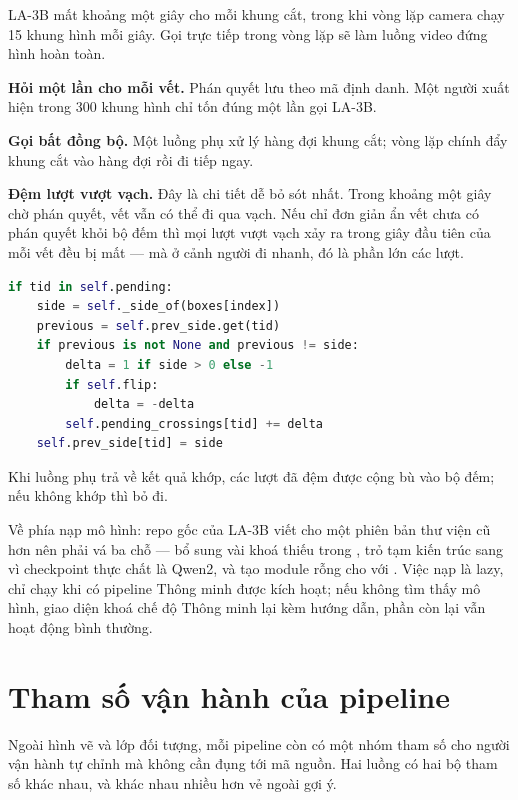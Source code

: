 LA-3B mất khoảng một giây cho mỗi khung cắt, trong khi vòng lặp camera chạy 15 khung
hình mỗi giây. Gọi trực tiếp trong vòng lặp sẽ làm luồng video đứng hình hoàn toàn.

\textbf{Hỏi một lần cho mỗi vết.} Phán quyết lưu theo mã định danh. Một người xuất hiện
trong 300 khung hình chỉ tốn đúng một lần gọi LA-3B.

\textbf{Gọi bất đồng bộ.} Một luồng phụ xử lý hàng đợi khung cắt; vòng lặp chính đẩy
khung cắt vào hàng đợi rồi đi tiếp ngay.

\textbf{Đệm lượt vượt vạch.} Đây là chi tiết dễ bỏ sót nhất. Trong khoảng một giây chờ
phán quyết, vết vẫn có thể đi qua vạch. Nếu chỉ đơn giản ẩn vết chưa có phán quyết khỏi
bộ đếm thì mọi lượt vượt vạch xảy ra trong giây đầu tiên của mỗi vết đều bị mất --- mà
ở cảnh người đi nhanh, đó là phần lớn các lượt.

\begin{lstlisting}[language=Python, caption={Ghi tạm lượt vượt vạch của vết đang chờ phán quyết, trích từ \code{app/smart\_filter.py}}]
if tid in self.pending:
    side = self._side_of(boxes[index])
    previous = self.prev_side.get(tid)
    if previous is not None and previous != side:
        delta = 1 if side > 0 else -1
        if self.flip:
            delta = -delta
        self.pending_crossings[tid] += delta
    self.prev_side[tid] = side
\end{lstlisting}

Khi luồng phụ trả về kết quả khớp, các lượt đã đệm được cộng bù vào bộ đếm; nếu không
khớp thì bỏ đi.

Về phía nạp mô hình: repo gốc của LA-3B viết cho một phiên bản thư viện cũ hơn nên phải
vá ba chỗ --- bổ sung vài khoá thiếu trong , trỏ tạm kiến trúc
 sang  vì checkpoint thực chất là Qwen2, và tạo module rỗng cho
 với . Việc nạp là lazy, chỉ chạy khi có pipeline Thông minh
được kích hoạt; nếu không tìm thấy mô hình, giao diện khoá chế độ Thông minh lại kèm
hướng dẫn, phần còn lại vẫn hoạt động bình thường.

\section{Tham số vận hành của pipeline}
\label{sec:thamso}

Ngoài hình vẽ và lớp đối tượng, mỗi pipeline còn có một nhóm tham số cho người vận
hành tự chỉnh mà không cần đụng tới mã nguồn. Hai luồng có hai bộ tham số khác nhau,
và khác nhau nhiều hơn vẻ ngoài gợi ý.

